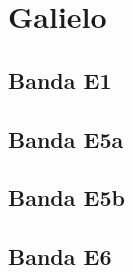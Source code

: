 \section{Galielo}
\label{sec:galileo}

\begin{justify}
\end{justify}

\subsection{Banda E1}

\begin{justify}
\end{justify}

\subsection{Banda E5a}

\begin{justify}
\end{justify}

\subsection{Banda E5b}

\begin{justify}
\end{justify}

\subsection{Banda E6}

\begin{justify}
\end{justify}